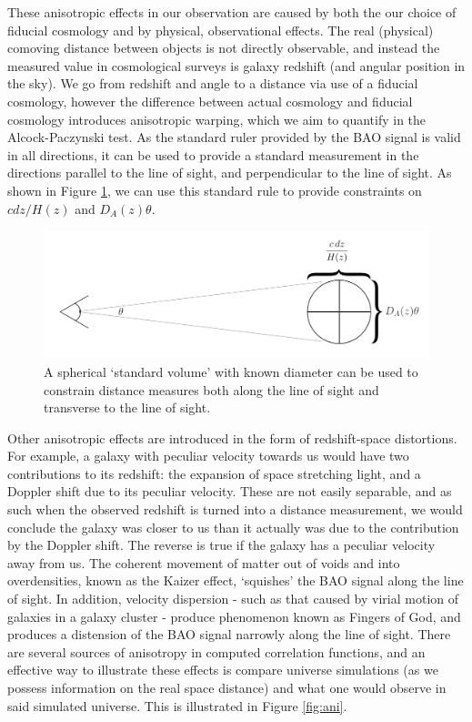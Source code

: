 \documentclass[titlesmallcaps, examinerscopy, copyrightpage]{uqthesis}
\begin{document}
These anisotropic effects in our observation are caused by both the our choice of fiducial cosmology and by physical, observational effects. The real (physical) comoving distance between objects is not directly observable, and instead the measured value in cosmological surveys is galaxy redshift (and angular position in the sky). We go from redshift and angle to a distance via use of a fiducial cosmology, however the difference between actual cosmology and fiducial cosmology introduces anisotropic warping, which we aim to quantify in the Alcock-Paczynski test. As the standard ruler provided by the BAO signal is valid in all directions, it can be used to provide a standard measurement in the directions parallel to the line of sight, and perpendicular to the line of sight. As shown in Figure \ref{fig:ap}, we can use this standard rule to provide constraints on $c dz /H(z)$ and $D_A(z)\theta$. 

\begin{figure}[h!]
  \begin{center}
    \includegraphics[width=\textwidth]{images/AP.png}
  \end{center}
  \caption{A spherical `standard volume' with known diameter can be used to constrain distance measures both along the line of sight and transverse to the line of sight.}
  \label{fig:ap}
\end{figure}


Other anisotropic effects are introduced in the form of redshift-space distortions. For example, a galaxy with peculiar velocity towards us would have two contributions to its redshift: the expansion of space stretching light, and a Doppler shift due to its peculiar velocity. These are not easily separable, and as such when the observed redshift is turned into a distance measurement, we would conclude the galaxy was closer to us than it actually was due to the contribution by the Doppler shift. The reverse is true if the galaxy has a peculiar velocity away from us. The coherent movement of matter out of voids and into overdensities, known as the Kaizer effect, `squishes' the BAO signal along the line of sight. In addition, velocity dispersion - such as that caused by virial motion of galaxies in a galaxy cluster - produce phenomenon known as Fingers of God, and produces a distension of the BAO signal narrowly along the line of sight. There are several sources of anisotropy in computed correlation functions, and an effective way to illustrate these effects is compare universe simulations (as we possess information on the real space distance) and what one would observe in said simulated universe. This is illustrated  in Figure \ref{fig:ani}.\\
\end{document}
